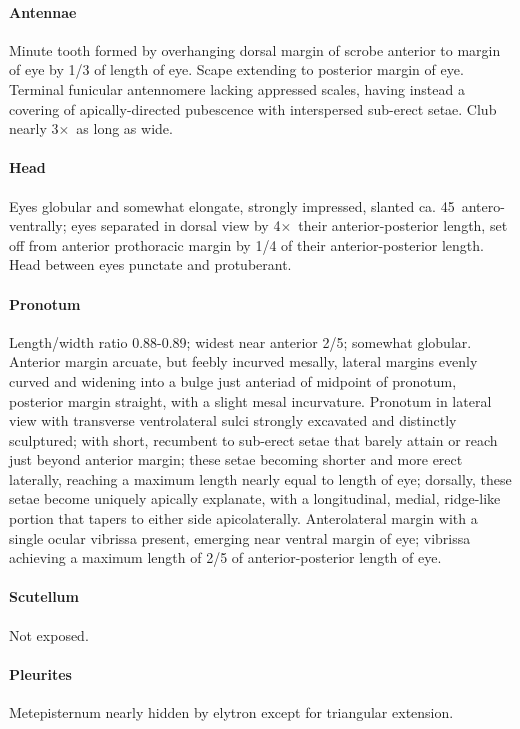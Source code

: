 \documentclass[fleqn,10pt,lineno]{wlpeerj} %
\newcommand{\td}{\textdegree~}
\newcommand{\x}{$\times$~}
\begin{document}
			\paragraph{Antennae}
				Minute tooth formed by overhanging dorsal margin of scrobe anterior to margin of eye by 1/3 of length of eye.
				Scape extending to posterior margin of eye.
				Terminal funicular antennomere lacking appressed scales, having instead a covering of apically-directed pubescence with interspersed sub-erect setae.
				Club nearly 3\x as long as wide.
			\paragraph{Head}
				Eyes globular and somewhat elongate, strongly impressed, slanted ca. 45\td antero-ventrally; eyes separated in dorsal view by 4\x their anterior-posterior length, set off from anterior prothoracic margin by 1/4 of their anterior-posterior length. 
				Head between eyes punctate and protuberant.
			\paragraph{Pronotum}
				Length/width ratio 0.88-0.89; widest near anterior 2/5; somewhat globular. 
				Anterior margin arcuate, but feebly incurved mesally, lateral margins evenly curved and widening into a bulge just anteriad of midpoint of pronotum, posterior margin straight, with a slight mesal incurvature. 
				Pronotum in lateral view with transverse ventrolateral sulci strongly excavated and distinctly sculptured; with short, recumbent to sub-erect setae that barely attain or reach just beyond anterior margin; these setae becoming shorter and more erect laterally, reaching a maximum length nearly equal to length of eye; dorsally, these setae become uniquely apically explanate, with a longitudinal, medial, ridge-like portion that tapers to either side apicolaterally.
				Anterolateral margin with a single ocular vibrissa present, emerging near ventral margin of eye; vibrissa achieving a maximum length of 2/5 of anterior-posterior length of eye.
			\paragraph{Scutellum}
				Not exposed.
			\paragraph{Pleurites}
				Metepisternum nearly hidden by elytron except for triangular extension.
\end{document}
